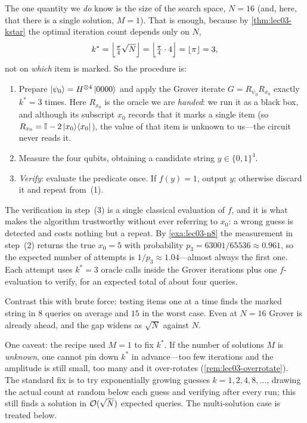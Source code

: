 \begin{example}
The one quantity we \emph{do} know is the size of the search space, $N=16$ (and,
here, that there is a single solution, $M=1$). That is enough, because by
\cref{thm:lec03-kstar} the optimal iteration count depends only on $N$,
\[
  k^{\ast}=\Bigl\lfloor\tfrac{\pi}{4}\sqrt{N}\Bigr\rfloor
         =\Bigl\lfloor\tfrac{\pi}{4}\cdot4\Bigr\rfloor=\lfloor\pi\rfloor=3,
\]
not on \emph{which} item is marked. So the procedure is:
\begin{enumerate}[label=(\arabic*),leftmargin=1.9em,itemsep=1pt,topsep=2pt]
  \item Prepare $\ket{\psi_0}=H^{\otimes4}\ket{0000}$ and apply the Grover iterate
        $G=R_{\psi_0}R_{x_0}$ exactly $k^{\ast}=3$ times. Here $R_{x_0}$ is the oracle
        we are \emph{handed}: we run it as a black box, and although its subscript
        $x_0$ records that it marks a single item (so $R_{x_0}=\mathbb{I}-2\ket{x_0}\!\bra{x_0}$), the
        value of that item is unknown to us---the circuit never reads it.
  \item Measure the four qubits, obtaining a candidate string $y\in\{0,1\}^4$.
  \item \emph{Verify}: evaluate the predicate once. If $f(y)=1$, output $y$;
        otherwise discard it and repeat from~(1).
\end{enumerate}
The verification in step~(3) is a single classical evaluation of $f$, and it is what
makes the algorithm trustworthy without ever referring to $x_0$: a wrong guess is
detected and costs nothing but a repeat. By \cref{exa:lec03-n8} the measurement in
step~(2) returns the true $x_0=5$ with probability $p_3=63001/65536\approx0.961$, so
the expected number of attempts is $1/p_3\approx1.04$---almost always the first one.
Each attempt uses $k^{\ast}=3$ oracle calls inside the Grover iterations plus one
$f$-evaluation to verify, for an expected total of about four queries.

Contrast this with brute force: testing items one at a time finds the marked string
in $8$ queries on average and $15$ in the worst case. Even at $N=16$ Grover is
already ahead, and the gap widens as $\sqrt N$ against $N$.

One caveat: the recipe used $M=1$ to fix $k^{\ast}$. If the number of solutions $M$
is \emph{unknown}, one cannot pin down $k^{\ast}$ in advance---too few iterations and
the amplitude is still small, too many and it over-rotates
(\cref{rem:lec03-overrotate}). The standard fix is to try exponentially growing
guesses $k=1,2,4,8,\dots$, drawing the actual count at random below each guess and
verifying after every run; this still finds a solution in $\mathcal{O}(\sqrt N)$ expected
queries. The multi-solution case is treated below.
\end{example}

